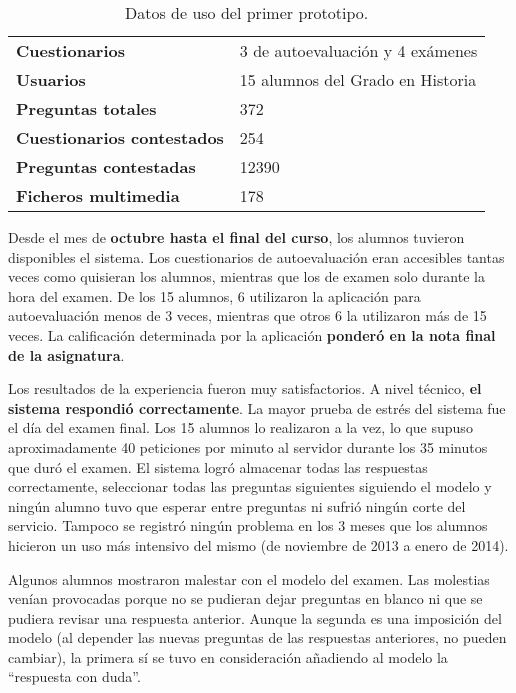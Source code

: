 \begin{table}[hc]
	\centering
	\begin{tabular}{l|l}
		{\bf Cuestionarios}             & 3 de autoevaluación y 4 exámenes \\ 
		{\bf Usuarios}                  & 15 alumnos del Grado en Historia \\
		{\bf Preguntas totales}         & 372                              \\ 
		{\bf Cuestionarios contestados} & 254                              \\ 
		{\bf Preguntas contestadas}     & 12390                            \\ 
		{\bf Ficheros multimedia}		& 178							   \\
	\end{tabular}
	\caption{Datos de uso del primer prototipo.}
\end{table}

Desde el mes de \textbf{octubre hasta el final del curso}, los alumnos tuvieron disponibles el sistema. Los cuestionarios de autoevaluación eran accesibles tantas veces como quisieran los alumnos, mientras que los de examen solo durante la hora del examen. De los 15 alumnos, 6 utilizaron la aplicación para autoevaluación menos de 3 veces, mientras que otros 6 la utilizaron más de 15 veces. La calificación determinada por la aplicación \textbf{ponderó en la nota final de la asignatura}.

Los resultados de la experiencia fueron muy satisfactorios. A nivel técnico, \textbf{el sistema respondió correctamente}. La mayor prueba de estrés del sistema fue el día del examen final. Los 15 alumnos lo realizaron a la vez, lo que supuso aproximadamente 40 peticiones por minuto al servidor durante los 35 minutos que duró el examen. El sistema logró almacenar todas las respuestas correctamente, seleccionar todas las preguntas siguientes siguiendo el modelo y ningún alumno tuvo que esperar entre preguntas ni sufrió ningún corte del servicio. Tampoco se registró ningún problema en los 3 meses que los alumnos hicieron un uso más intensivo del mismo (de noviembre de 2013 a enero de 2014).

Algunos alumnos mostraron malestar con el modelo del examen. Las molestias venían provocadas porque no se pudieran dejar preguntas en blanco ni que se pudiera revisar una respuesta anterior. Aunque la segunda es una imposición del modelo (al depender las nuevas preguntas de las respuestas anteriores, no pueden cambiar), la primera sí se tuvo en consideración añadiendo al modelo la ``respuesta con duda''.

